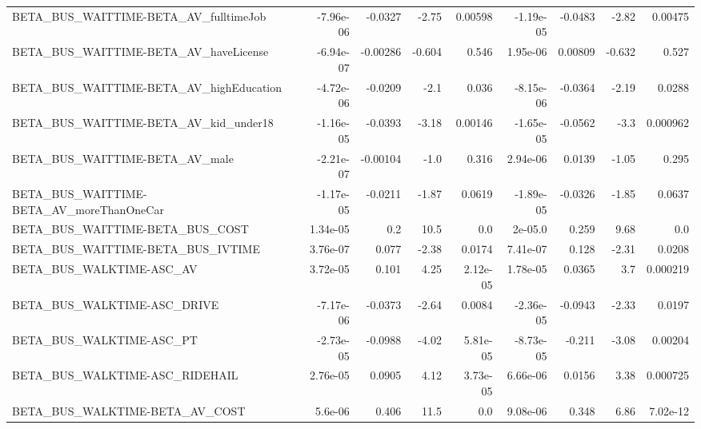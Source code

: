 \begin{tabular}{lrrrrrrrr}
BETA\_BUS\_WAITTIME-BETA\_AV\_fulltimeJob              &   -7.96e-06 &      -0.0327 &    -2.75 &  0.00598 &  -1.19e-05 &     -0.0483 &        -2.82 &       0.00475 \\
BETA\_BUS\_WAITTIME-BETA\_AV\_haveLicense              &   -6.94e-07 &     -0.00286 &   -0.604 &    0.546 &   1.95e-06 &     0.00809 &       -0.632 &         0.527 \\
BETA\_BUS\_WAITTIME-BETA\_AV\_highEducation            &   -4.72e-06 &      -0.0209 &     -2.1 &    0.036 &  -8.15e-06 &     -0.0364 &        -2.19 &        0.0288 \\
BETA\_BUS\_WAITTIME-BETA\_AV\_kid\_under18              &   -1.16e-05 &      -0.0393 &    -3.18 &  0.00146 &  -1.65e-05 &     -0.0562 &         -3.3 &      0.000962 \\
BETA\_BUS\_WAITTIME-BETA\_AV\_male                     &   -2.21e-07 &     -0.00104 &     -1.0 &    0.316 &   2.94e-06 &      0.0139 &        -1.05 &         0.295 \\
BETA\_BUS\_WAITTIME-BETA\_AV\_moreThanOneCar           &   -1.17e-05 &      -0.0211 &    -1.87 &   0.0619 &  -1.89e-05 &     -0.0326 &        -1.85 &        0.0637 \\
BETA\_BUS\_WAITTIME-BETA\_BUS\_COST                    &    1.34e-05 &          0.2 &     10.5 &      0.0 &    2e-05.0 &       0.259 &         9.68 &           0.0 \\
BETA\_BUS\_WAITTIME-BETA\_BUS\_IVTIME                  &    3.76e-07 &        0.077 &    -2.38 &   0.0174 &   7.41e-07 &       0.128 &        -2.31 &        0.0208 \\
BETA\_BUS\_WALKTIME-ASC\_AV                           &    3.72e-05 &        0.101 &     4.25 & 2.12e-05 &   1.78e-05 &      0.0365 &          3.7 &      0.000219 \\
BETA\_BUS\_WALKTIME-ASC\_DRIVE                        &   -7.17e-06 &      -0.0373 &    -2.64 &   0.0084 &  -2.36e-05 &     -0.0943 &        -2.33 &        0.0197 \\
BETA\_BUS\_WALKTIME-ASC\_PT                           &   -2.73e-05 &      -0.0988 &    -4.02 & 5.81e-05 &  -8.73e-05 &      -0.211 &        -3.08 &       0.00204 \\
BETA\_BUS\_WALKTIME-ASC\_RIDEHAIL                     &    2.76e-05 &       0.0905 &     4.12 & 3.73e-05 &   6.66e-06 &      0.0156 &         3.38 &      0.000725 \\
BETA\_BUS\_WALKTIME-BETA\_AV\_COST                     &     5.6e-06 &        0.406 &     11.5 &      0.0 &   9.08e-06 &       0.348 &         6.86 &      7.02e-12 \\

\end{tabular}
